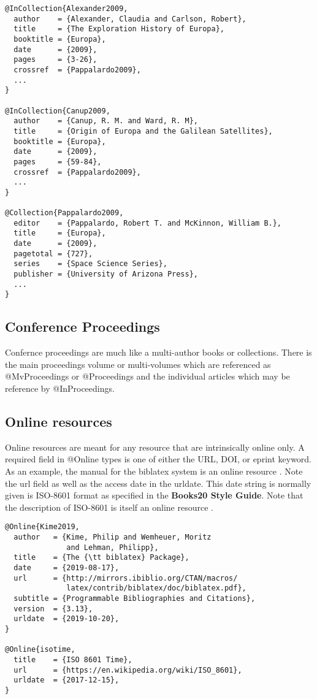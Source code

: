 \documentclass{article}
\begin{document}
\begin{verbatim}
@InCollection{Alexander2009,
  author    = {Alexander, Claudia and Carlson, Robert},
  title     = {The Exploration History of Europa},
  booktitle = {Europa},
  date      = {2009},
  pages     = {3-26},
  crossref  = {Pappalardo2009},
  ...
}

@InCollection{Canup2009,
  author    = {Canup, R. M. and Ward, R. M},
  title     = {Origin of Europa and the Galilean Satellites},
  booktitle = {Europa},
  date      = {2009},
  pages     = {59-84},
  crossref  = {Pappalardo2009},
  ...
}

@Collection{Pappalardo2009,
  editor    = {Pappalardo, Robert T. and McKinnon, William B.},
  title     = {Europa},
  date      = {2009},
  pagetotal = {727},
  series    = {Space Science Series},
  publisher = {University of Arizona Press},
  ...
}
\end{verbatim}

\subsection{Conference Proceedings}

Confernce proceedings are much like a multi-author books or
collections.  There is the main proceedings volume or multi-volumes
which are referenced as {\ttfamily @MvProceedings} or {\ttfamily
  @Proceedings} and the individual articles which may be reference by
{\ttfamily @InProceedings}.

\subsection{Online resources}

Online resources are meant for any resource that are intrinsically
online only.  A required field in {\ttfamily @Online} types is one of
either the {\ttfamily URL}, {\ttfamily DOI}, or {\ttfamily eprint}
keyword. As an example, the manual for the {\ttfamily biblatex} system
is an online resource \cite{Kime2019}. Note the {\ttfamily url} field
as well as the access date in the {\ttfamily urldate}. This date
string is normally given is ISO-8601 format as specified in the
{\bfseries Books20 Style Guide}. Note that the description of ISO-8601
is itself an online resource \cite{isotime}.

\begin{verbatim}
@Online{Kime2019,
  author   = {Kime, Philip and Wemheuer, Moritz
              and Lehman, Philipp},
  title    = {The {\tt biblatex} Package},
  date     = {2019-08-17},
  url      = {http://mirrors.ibiblio.org/CTAN/macros/
              latex/contrib/biblatex/doc/biblatex.pdf},
  subtitle = {Programmable Bibliographies and Citations},
  version  = {3.13},
  urldate  = {2019-10-20},
}

@Online{isotime,
  title    = {ISO 8601 Time},
  url      = {https://en.wikipedia.org/wiki/ISO_8601},
  urldate  = {2017-12-15},
}
\end{verbatim}
\end{document}
